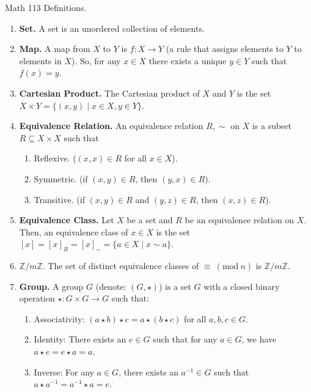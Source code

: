 \documentclass[12pt]{article}
\theoremstyle{definition}
\theoremstyle{named}
\newcommand{\Mod}[1]{\ (\mathrm{mod}\ #1)}
\begin{document}
\begin{center}
    Math 113 Definitions. 
\end{center}

\begin{enumerate}
    \item \textbf{Set. } A set is an unordered collection of elements. 
    \item \textbf{Map. } A map from $X$ to $Y$ is $f: X \to Y$ (a rule that assigns elements to $Y$ to elements in $X$). So, for any $x \in X$ there exists a unique $y \in Y$ such that $f(x)=y$. 
    \item \textbf{Cartesian Product. } The Cartesian product of $X$ and $Y$ is the set $X \times Y = \{(x,y) \mid x \in X, y \in Y\}$. 
    \item \textbf{Equivalence Relation. } An equivalence relation $R,\sim$ on $X$ is a subset $R \subseteq X \times X$ such that
    \begin{enumerate}
        \item Reflexive. ($(x,x) \in R$ for all $x \in X$). 
        \item Symmetric. (if $(x,y) \in R$, then $(y,x) \in R$). 
        \item Transitive. (if $(x,y) \in R$ and $(y,z) \in R$, then $(x,z) \in R$). 
    \end{enumerate}
    \item \textbf{Equivalence Class. } Let $X$ be a set and $R$ be an equivalence relation on $X$. Then, an equivalence class of $x\in  X$ is the set $[x]=[x]_R=[x]_{\sim} = \{a \in X \mid x \sim a\}$. 
    \item \textbf{$\mathbb{Z}/m\mathbb{Z}. $} The set of distinct equivalence classes of $\equiv \Mod{n}$ is $\mathbb{Z}/m\mathbb{Z}$.
	\item \textbf{Group. } A group $G$ (denote: $(G,\star)$) is a set $G$ with a closed binary operation $\star: G \times G \to G$ such that: 
	\begin{enumerate}
		\item Associativity: $(a \star b) \star c = a \star (b \star c)$ for all $a,b,c \in G$. 
		\item Identity: There exists an $e \in G$ such that for any $a \in G$, we have $a \star e = e \star a = a$. 
		\item Inverse: For any $a \in G$, there exists an $a^{-1} \in G$ such that $a \star a^{-1} = a^{-1} \star a = e$. 
	\end{enumerate} 
\end{enumerate}
\end{document}
